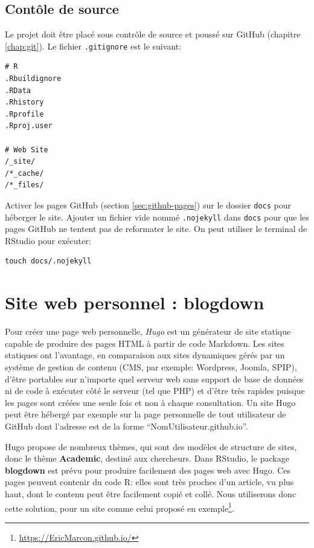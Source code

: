 \documentclass[
  12pt,
  french,
  a4paper,
  extrafontsizes,onecolumn,openright
  ]{memoir}
\begin{document}
\hypertarget{contuxf4le-de-source}{%
\subsection{Contôle de source}\label{contuxf4le-de-source}}

Le projet doit être placé sous contrôle de source et poussé sur GitHub (chapitre \ref{chap:git}).
Le fichier \texttt{.gitignore} est le suivant:

\begin{verbatim}
# R
.Rbuildignore
.RData
.Rhistory
.Rprofile
.Rproj.user

# Web Site
/_site/
/*_cache/
/*_files/
\end{verbatim}

Activer les pages GitHub (section \ref{sec:github-pages}) sur le dossier \texttt{docs} pour héberger le site.
Ajouter un fichier vide nommé \texttt{.nojekyll} dans \texttt{docs} pour que les pages GitHub ne tentent pas de reformater le site.
On peut utiliser le terminal de RStudio pour exécuter:

\begin{verbatim}
touch docs/.nojekyll
\end{verbatim}

\hypertarget{sec:blogdown}{%
\section{Site web personnel : blogdown}\label{sec:blogdown}}

Pour créer une page web personnelle, \emph{Hugo} est un générateur de site statique capable de produire des pages HTML à partir de code Markdown.
Les sites statiques ont l'avantage, en comparaison aux sites dynamiques gérés par un système de gestion de contenu (CMS, par exemple: Wordpress, Joomla, SPIP), d'être portables sur n'importe quel serveur web sans support de base de données ni de code à exécuter côté le serveur (tel que PHP) et d'être très rapides puisque les pages sont créées une seule fois et non à chaque consultation.
Un site Hugo peut être hébergé par exemple sur la page personnelle de tout utilisateur de GitHub dont l'adresse est de la forme \enquote{NomUtilisateur.github.io}.

Hugo propose de nombreux thèmes, qui sont des modèles de structure de sites, donc le thème \textbf{Academic}, destiné aux chercheurs.
Dans RStudio, le package \textbf{blogdown} est prévu pour produire facilement des pages web avec Hugo.
Ces pages peuvent contenir du code R: elles sont très proches d'un article, vu plus haut, dont le contenu peut être facilement copié et collé.
Nous utiliserons donc cette solution, pour un site comme celui proposé en exemple\footnote{\url{https://EricMarcon.github.io/}}.
\end{document}
